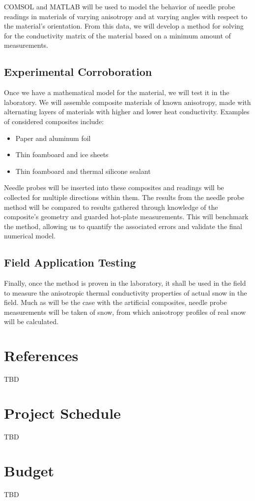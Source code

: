 \documentclass[12pt, letterpaper]{article}
\begin{document}
COMSOL and MATLAB will be used to model the behavior of needle probe readings in materials of varying anisotropy and at varying angles with respect to the material's orientation. From this data, we will develop a method for solving for the conductivity matrix of the material based on a minimum amount of measurements.

\subsection{Experimental Corroboration}

Once we have a mathematical model for the material, we will test it in the laboratory. We will assemble composite materials of known anisotropy, made with alternating layers of materials with higher and lower heat conductivity. Examples of considered composites include:
\begin{itemize}
\item Paper and aluminum foil
\item Thin foamboard and ice sheets
\item Thin foamboard and thermal silicone sealant
\end{itemize}
Needle probes will be inserted into these composites and readings will be collected for multiple directions within them. The results from the needle probe method will be compared to results gathered through knowledge of the composite's geometry and guarded hot-plate measurements. This will benchmark the method, allowing us to quantify the associated errors and validate the final numerical model.

\subsection{Field Application Testing}

Finally, once the method is proven in the laboratory, it shall be used in the field to measure the anisotropic thermal conductivity properties of actual snow in the field. Much as will be the case with the artificial composites, needle probe measurements will be taken of snow, from which anisotropy profiles of real snow will be calculated.

\section{References}

TBD

\section{Project Schedule}

TBD

\section{Budget}

TBD
\end{document}
